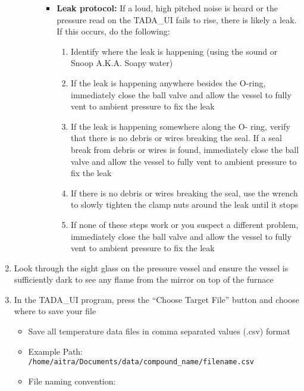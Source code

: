 \begin{enumerate}
\begin{itemize}
\begin{enumerate}
      \begin{itemize}
      \tightlist
      \item
        \textbf{Leak protocol:} If a loud, high pitched noise is heard
        or the pressure read on the TADA\_UI fails to rise, there is
        likely a leak. If this occurs, do the following:

        \begin{enumerate}
        \def\labelenumiii{\arabic{enumiii}.}
        \tightlist
        \item
          Identify where the leak is happening (using the sound or Snoop
          A.K.A. Soapy water)
        \item
          If the leak is happening anywhere besides the O-ring,
          immediately close the ball valve and allow the vessel to fully
          vent to ambient pressure to fix the leak
        \item
          If the leak is happening somewhere along the O- ring, verify
          that there is no debris or wires breaking the seal. If a seal
          break from debris or wires is found, immediately close the
          ball valve and allow the vessel to fully vent to ambient
          pressure to fix the leak
        \item
          If there is no debris or wires breaking the seal, use the
          wrench to slowly tighten the clamp nuts around the leak until
          it stops
        \item
          If none of these steps work or you suspect a different
          problem, immediately close the ball valve and allow the vessel
          to fully vent to ambient pressure to fix the leak
        \end{enumerate}
      \end{itemize}
    \end{enumerate}
  \end{itemize}
\item
  Look through the sight glass on the pressure vessel and ensure the
  vessel is sufficiently dark to see any flame from the mirror on top of
  the furnace
\item
  In the TADA\_UI program, press the ``Choose Target File'' button and
  choose where to save your file

  \begin{itemize}
  \item
    Save all temperature data files in comma separated values (.csv)
    format
  \item
    Example Path:
    \texttt{/home/aitra/Documents/data/compound\_name/filename.csv}
  \item
    File naming convention:


\end{itemize}
\end{enumerate}
